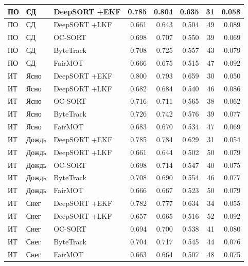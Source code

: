 \begin{longtable}{|p{2.42cm}|p{1.8cm}|p{2.4cm}|r|r|r|r|r|}
       ПО     &      СД & DeepSORT +EKF & 0.785 & 0.804 & 0.635 &   31 & 0.058  \\ \hline
       ПО     &      СД & DeepSORT +LKF & 0.661 & 0.643 & 0.504 &   49 & 0.089  \\ \hline
       ПО     &      СД &      OC-SORT & 0.698 & 0.707 & 0.550 &   39 & 0.069 \\ \hline
       ПО     &      СД &    ByteTrack & 0.708 & 0.725 & 0.557 &   43 & 0.079 \\ \hline
       ПО     &      СД &      FairMOT & 0.666 & 0.675 & 0.515 &   47 & 0.092 \\ \hline
       ИТ     &      Ясно & DeepSORT +EKF & 0.800 & 0.793 & 0.659 &   30 & 0.050  \\ \hline
       ИТ     &      Ясно & DeepSORT +LKF & 0.682 & 0.684 & 0.540 &   46 & 0.086  \\ \hline
       ИТ     &      Ясно &      OC-SORT & 0.716 & 0.711 & 0.565 &   38 & 0.062  \\ \hline
       ИТ     &      Ясно &    ByteTrack & 0.726 & 0.742 & 0.576 &   39 & 0.077  \\ \hline
       ИТ     &      Ясно &      FairMOT & 0.683 & 0.670 & 0.534 &   47 & 0.069  \\ \hline
       ИТ     &      Дождь & DeepSORT +EKF & 0.785 & 0.784 & 0.629 &   31 & 0.054  \\ \hline
       ИТ     &      Дождь & DeepSORT +LKF & 0.661 & 0.644 & 0.502 &   50 & 0.079  \\ \hline
       ИТ     &      Дождь &      OC-SORT & 0.698 & 0.714 & 0.547 &   40 & 0.075  \\ \hline
       ИТ     &      Дождь &    ByteTrack & 0.708 & 0.690 & 0.554 &   46 & 0.077  \\ \hline
       ИТ     &      Дождь &      FairMOT & 0.666 & 0.667 & 0.523 &   50 & 0.079  \\ \hline
       ИТ     &      Снег & DeepSORT +EKF & 0.782 & 0.777 & 0.634 &   34 & 0.055  \\ \hline
       ИТ     &      Снег & DeepSORT +LKF & 0.657 & 0.665 & 0.516 &   52 & 0.092  \\ \hline
       ИТ     &      Снег &      OC-SORT & 0.694 & 0.700 & 0.538 &   41 & 0.080  \\ \hline
       ИТ     &      Снег &    ByteTrack & 0.704 & 0.717 & 0.545 &   44 & 0.076  \\ \hline
       ИТ     &      Снег &      FairMOT & 0.663 & 0.664 & 0.507 &   48 & 0.075  \\ \hline

\end{longtable}
